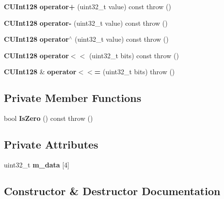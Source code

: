 \begin{DoxyCompactItemize}
\item 
{\bf CUInt128} {\bfseries operator+} (uint32\_\-t value) const   throw ()\label{classKademlia_1_1CUInt128_a44e2d9a3e4969b3f7e1e1a058a01395e}

\item 
{\bf CUInt128} {\bfseries operator-\/} (uint32\_\-t value) const   throw ()\label{classKademlia_1_1CUInt128_a24d0323254c188d5cc93db5ba75ce399}

\item 
{\bf CUInt128} {\bfseries operator$^\wedge$} (uint32\_\-t value) const   throw ()\label{classKademlia_1_1CUInt128_a5d6eb07151f66287ba9b9d77f6217782}

\item 
{\bf CUInt128} {\bfseries operator$<$$<$} (uint32\_\-t bits) const   throw ()\label{classKademlia_1_1CUInt128_a15024e5c56ff44d9a65a24515bf4d12e}

\item 
{\bf CUInt128} \& {\bfseries operator$<$$<$=} (uint32\_\-t bits)  throw ()\label{classKademlia_1_1CUInt128_aa53dbcec69cb09662041ee0b166935f0}

\end{DoxyCompactItemize}
\subsection*{Private Member Functions}
\begin{DoxyCompactItemize}
\item 
bool {\bfseries IsZero} () const   throw ()\label{classKademlia_1_1CUInt128_ab77a9a3c1b74300a39a9a06e9bd4c0de}

\end{DoxyCompactItemize}
\subsection*{Private Attributes}
\begin{DoxyCompactItemize}
\item 
uint32\_\-t {\bfseries m\_\-data} [4]\label{classKademlia_1_1CUInt128_a58927dc65af01226e71bcf0badd32594}

\end{DoxyCompactItemize}


\subsection{Constructor \& Destructor Documentation}
